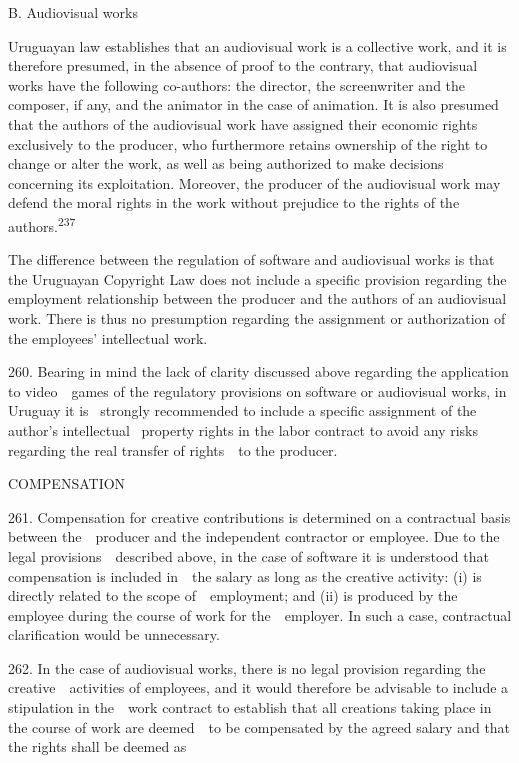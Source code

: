 \documentclass[
]{article}
\begin{document}
{B. Audiovisual works}

{Uruguayan law establishes that an audiovisual work is a collective
work, and it is therefore presumed, in the absence of proof to the
contrary, that audiovisual works have the following co-authors: the
director, the screenwriter and the composer, if any, and the animator in
the case of animation. It is also presumed that the authors of the
audiovisual work have assigned their economic rights exclusively to the
producer, who furthermore retains ownership of the right to change or
alter the work, as well as being authorized to make decisions concerning
its exploitation. Moreover, the producer of the audiovisual work may
defend the moral rights in the work without prejudice to the rights of
the authors.}\textsuperscript{{237}}

{The difference between the regulation of software and audiovisual works
is that the Uruguayan }{Copyright Law }{does not include a specific
provision regarding the employment relationship between the producer and
the authors of an audiovisual work. There is thus no presumption
regarding the assignment or authorization of }{the employees'
intellectual work}{.}

{260. }{Bearing in mind the lack of clarity discussed above regarding
the application to video~~games of the regulatory provisions on software
or audiovisual works, in Uruguay it is }{~strongly recommended to
include a specific assignment of the author's intellectual }{~property
rights in the labor contract to avoid any risks regarding the real
transfer of rights~~to the producer.}

{COMPENSATION}

{261. }{Compensation for creative contributions is determined on a
contractual basis between the~~producer and the independent contractor
or employee. Due to the legal provisions~~described above, in the case
of software it is understood that compensation is included in~~the
salary as long as the creative activity: (i) is directly related to the
scope of~~employment; and (ii) is produced by the employee during the
course of work for the~~employer. In such a case, contractual
clarification would be unnecessary.}

{262. }{In the case of audiovisual works, there is no legal provision
regarding the creative~~activities of employees, and it would therefore
be advisable to include a stipulation in the~~work contract to establish
that all creations taking place in the course of work are deemed~~to be
compensated by the agreed salary and that the rights shall be deemed as}
\end{document}
